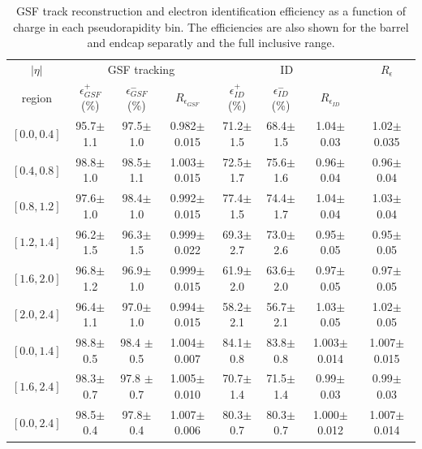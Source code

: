 \begin{table}[htbp]
\begin{center}
\begin{sideways}
\begin{tabular}{cccccccc}
    \toprule
$|\eta|$  & \multicolumn{3}{c}{GSF tracking } & \multicolumn{3}{c}{ID } & $R_\epsilon$ \\
region    & $\epsilon_{GSF}^+$ (\%) &$\epsilon_{GSF}^-$ (\%) & $R_{\epsilon_{GSF}}$ 
                                              & $\epsilon_{ID}^+$ (\%) &$\epsilon_{ID}^-$ (\%) & $R_{\epsilon_{ID}}$ &  \\
\midrule
$\left[ 0.0,0.4 \right]$ & 95.7$\pm$1.1 & 97.5$\pm$1.0 & 0.982$\pm$0.015 & 71.2$\pm$1.5 & 68.4$\pm$1.5 & 1.04$\pm$0.03 &1.02$\pm$0.035  \\
$\left[ 0.4,0.8 \right]$ & 98.8$\pm$ 1.0& 98.5$\pm$1.1 & 1.003$\pm$0.015 & 72.5$\pm$1.7 & 75.6$\pm$1.6 & 0.96$\pm$0.04 &0.96$\pm$ 0.04 \\
$\left[ 0.8,1.2 \right]$ & 97.6$\pm$ 1.0& 98.4$\pm$1.0 & 0.992$\pm$0.015 & 77.4$\pm$1.5 & 74.4$\pm$1.7 & 1.04$\pm$0.04 &1.03$\pm$ 0.04 \\
$\left[ 1.2,1.4 \right]$ & 96.2$\pm$ 1.5& 96.3$\pm$1.5 & 0.999$\pm$0.022 & 69.3$\pm$2.7 & 73.0$\pm$2.6 & 0.95$\pm$0.05 &0.95$\pm$0.05  \\
$\left[ 1.6,2.0 \right]$ & 96.8$\pm$ 1.2& 96.9$\pm$1.0 & 0.999$\pm$0.015 & 61.9$\pm$2.0 & 63.6$\pm$2.0 & 0.97$\pm$0.05 &0.97$\pm$0.05  \\
$\left[ 2.0,2.4 \right]$ & 96.4$\pm$ 1.1& 97.0$\pm$1.0 & 0.994$\pm$0.015 & 58.2$\pm$2.1 & 56.7$\pm$2.1 & 1.03$\pm$0.05 &1.02$\pm$0.05  \\
\midrule
$\left[ 0.0,1.4 \right]$ & 98.8$\pm$0.5 & 98.4 $\pm$0.5 & 1.004$\pm$0.007 & 84.1$\pm$0.8 & 83.8$\pm$0.8 & 1.003$\pm$0.014 & 1.007$\pm$ 0.015 \\
$\left[ 1.6,2.4 \right]$ & 98.3$\pm$0.7 & 97.8 $\pm$0.7 & 1.005$\pm$0.010 & 70.7$\pm$1.4 & 71.5$\pm$1.4 & 0.99$\pm$0.03 &0.99$\pm$ 0.03 \\
\midrule 
$\left[ 0.0,2.4 \right]$ & 98.5$\pm$0.4 & 97.8$\pm$0.4 & 1.007$\pm$0.006 & 80.3$\pm$0.7 & 80.3$\pm$0.7 & 1.000$\pm$0.012 &1.007$\pm$0.014  \\
    \bottomrule
\end{tabular}
\end{sideways}
\end{center}
\caption{\ac{GSF} track reconstruction and electron identification efficiency as
a function of charge in each pseudorapidity bin. The efficiencies are also shown
for the barrel and endcap separatly and the full inclusive range.}
\label{tab:tagprobe}
\end{table}

